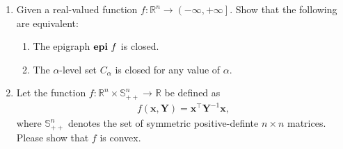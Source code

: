 \documentclass[11pt,letter,notitlepage]{article}
\theoremstyle{definition}
\DeclareMathOperator*{\epi}{\bf epi\,}
\begin{document}
\newpage




\begin{exercise}
	\begin{enumerate}
		\item Given a real-valued function $f:\mathbb{R}^n \to \left( - \infty,+\infty \right]$. Show that the following are equivalent:
		      \begin{enumerate}
			      \item The epigraph $\epi f$ is closed.
			      \item The $\alpha$-level set $C_{\alpha}$ is closed for any value of $\alpha$.
		      \end{enumerate}
		\item Let the function $f:\mathbb{R}^n \times \mathbb{S}^n_{++} \rightarrow \mathbb{R}$ be defined as
		      \begin{align*}
			      f(\mathbf{x},\mathbf{Y}) = \mathbf{x}^{\top}\mathbf{Y}^{-1}\mathbf{x},
		      \end{align*}
		      where $\mathbb{S}^n_{++}$ denotes the set of symmetric positive-definte $n \times n$ matrices. Please show that $f$ is convex.
	\end{enumerate}
\end{exercise}
\end{document}
